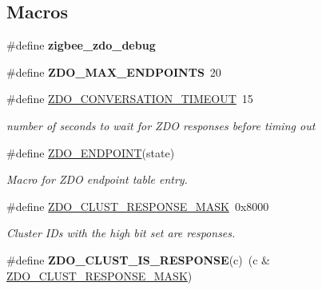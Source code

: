 \subsection*{Macros}
\begin{DoxyCompactItemize}
\item 
\mbox{\label{group__zdo_ga126dd7828d5c11842a466f1a792f8674}} 
\#define {\bfseries zigbee\+\_\+zdo\+\_\+debug}
\item 
\mbox{\label{group__zdo_ga00aac62a0e22c8d6accd9bb701188c34}} 
\#define {\bfseries Z\+D\+O\+\_\+\+M\+A\+X\+\_\+\+E\+N\+D\+P\+O\+I\+N\+TS}~20
\item 
\mbox{\label{group__zdo_gae1d68b13491e1e29493f412d984886e7}} 
\#define \hyperlink{group__zdo_gae1d68b13491e1e29493f412d984886e7}{Z\+D\+O\+\_\+\+C\+O\+N\+V\+E\+R\+S\+A\+T\+I\+O\+N\+\_\+\+T\+I\+M\+E\+O\+UT}~15
\begin{DoxyCompactList}\small\item\em number of seconds to wait for Z\+DO responses before timing out \end{DoxyCompactList}\item 
\#define \hyperlink{group__zdo_gaef7118e478f5ad9949dcd23f6e0901c9}{Z\+D\+O\+\_\+\+E\+N\+D\+P\+O\+I\+NT}(state)
\begin{DoxyCompactList}\small\item\em Macro for Z\+DO endpoint table entry. \end{DoxyCompactList}\item 
\mbox{\label{group__zdo_ga79de2096f8f5c8c313ad1c963a0c81e5}} 
\#define \hyperlink{group__zdo_ga79de2096f8f5c8c313ad1c963a0c81e5}{Z\+D\+O\+\_\+\+C\+L\+U\+S\+T\+\_\+\+R\+E\+S\+P\+O\+N\+S\+E\+\_\+\+M\+A\+SK}~0x8000
\begin{DoxyCompactList}\small\item\em Cluster I\+Ds with the high bit set are responses. \end{DoxyCompactList}\item 
\mbox{\label{group__zdo_ga87a413d580d227c0a5da654c4177b154}} 
\#define {\bfseries Z\+D\+O\+\_\+\+C\+L\+U\+S\+T\+\_\+\+I\+S\+\_\+\+R\+E\+S\+P\+O\+N\+SE}(c)~(c \& \hyperlink{group__zdo_ga79de2096f8f5c8c313ad1c963a0c81e5}{Z\+D\+O\+\_\+\+C\+L\+U\+S\+T\+\_\+\+R\+E\+S\+P\+O\+N\+S\+E\+\_\+\+M\+A\+SK})
\item 

\end{DoxyCompactItemize}
